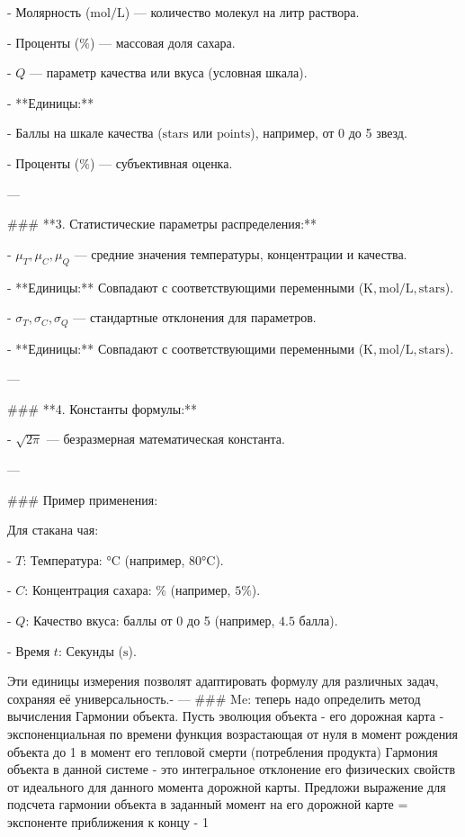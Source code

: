     - Молярность (\( \text{mol/L} \)) — количество молекул на литр раствора.

    - Проценты (\( \% \)) — массовая доля сахара.


- \( Q \) — параметр качества или вкуса (условная шкала).

  - **Единицы:** 

    - Баллы на шкале качества (\( \text{stars} \) или \( \text{points} \)), например, от 0 до 5 звезд.

    - Проценты (\( \% \)) — субъективная оценка.


---


### **3. Статистические параметры распределения:**

- \( \mu_T, \mu_C, \mu_Q \) — средние значения температуры, концентрации и качества.

  - **Единицы:** Совпадают с соответствующими переменными (\( \text{K}, \text{mol/L}, \text{stars} \)).


- \( \sigma_T, \sigma_C, \sigma_Q \) — стандартные отклонения для параметров.

  - **Единицы:** Совпадают с соответствующими переменными (\( \text{K}, \text{mol/L}, \text{stars} \)).


---


### **4. Константы формулы:**

- \( \sqrt{2\pi} \) — безразмерная математическая константа.


---


### Пример применения:

Для стакана чая:

- \( T \): Температура:  \( ° \text{C} \) (например, \( 80 ° \text{C} \)).

- \( C \): Концентрация сахара: \( \% \) (например, \( 5\% \)).

- \( Q \): Качество вкуса: баллы от 0 до 5 (например, \( 4.5 \) балла).

- Время \( t \): Секунды (\( \text{s} \)).


Эти единицы измерения позволят адаптировать формулу для различных задач, сохраняя её универсальность.-
---
### Me:
теперь надо определить метод вычисления Гармонии объекта.
Пусть эволюция объекта - его дорожная карта - экспоненциальная по времени функция возрастающая от нуля в момент рождения объекта до 1 в момент его тепловой смерти (потребления продукта)
Гармония объекта в данной системе - это интегральное отклонение его физических свойств от идеального для данного момента дорожной карты.
Предложи выражение для подсчета гармонии объекта в заданный момент на его дорожной карте = экспоненте приближения к концу - 1


